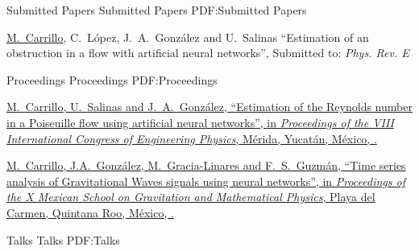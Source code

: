 \documentclass[letterpaper,MMMyyyy,nonstopmode]{simpleresumecv}
\begin{document}
\begin{Body}






\SubSection
{Submitted Papers}
{Submitted Papers}
{PDF:Submitted Papers}

\begingroup

\BigGap
\NumberedItem{[1]}
{\underline{M.~Carrillo}, C.~L\'opez, J.~A.~Gonz\'alez and U.~Salinas
``Estimation of an obstruction in a flow with artificial neural networks'', Submitted to:
\textit{Phys. Rev. E}}

\endgroup


\SubSection
{Proceedings}
{Proceedings}
{PDF:Proceedings}

\begingroup

\Gap
\NumberedItem{[1]}
\href{http://iopscience.iop.org/article/10.1088/1742-6596/792/1/012071/meta}
{\underline{M.~Carrillo}, U.~Salinas and J.~A.~Gonz\'alez,
``Estimation of the Reynolds number in a Poiseuille flow using artificial neural networks'',
in \textit{Proceedings of the VIII International Congress of Engineering Physics},
M\'erida, Yucat\'an, M\'exico,
.}


\Gap
\NumberedItem{[2]}
\href{doi:10.1088/1742-6596/654/1/012001}
{\underline{M.~Carrillo}, J.A.~Gonz\'alez, M.~Gracia-Linares and F.~S.~Guzm\'an,
``Time series analysis of Gravitational Waves signals using neural networks'',
in \textit{Proceedings of the X Mexican School on Gravitation and Mathematical Physics}, Playa del Carmen, Quintana Roo, M\'exico,
.}

\endgroup


\Section
{Talks}
{Talks}
{PDF:Talks}



\end{Body}
\end{document}
